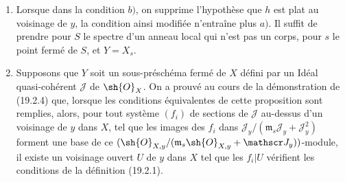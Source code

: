 \begin{remarks}[19.2.5]
\label{IV.19.2.5}
\begin{enumerate}
  \item[(i)] Lorsque dans la condition $b)$, on supprime l'hypothèse que $h$ est plat au voisinage de $y$, la condition ainsi modifiée n'entraîne plus $a)$. Il suffit de prendre pour $S$ le spectre d'un anneau local qui n'est pas un corps, pour $s$ le point fermé de $S$, et $Y=X_s$.
  \item[(ii)] Supposons que $Y$ soit un sous-préschéma fermé de $X$ défini par un Idéal quasi-cohérent $\mathscr J$ de $\sh{O}_X$. On a prouvé au cours de la démonstration de (19.2.4) que, lorsque les conditions équivalentes de cette proposition sont remplies, alors, pour tout système $(f_i)$ de sections de $\mathscr J$ au-dessus d'un voisinage de $y$ dans $X$, tel que les images des $f_i$ dans $\mathscr J_y/(\mathfrak m_s\mathscr J_y+\mathscr J_y^2)$ forment une base de ce $(\sh{O}_{X,y}/(\mathfrak m_s\sh{O}_{X,y}+\mathscr J_y))$-module, il existe un voisinage ouvert $U$ de $y$ dans $X$ tel que les $f_i|U$ vérifient les conditions de la définition (19.2.1).
\end{enumerate}
\end{remarks}

